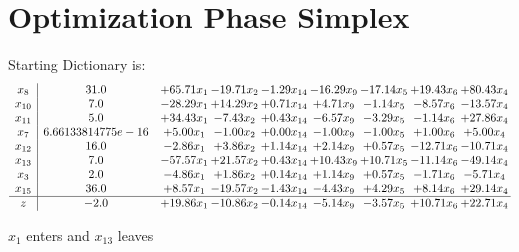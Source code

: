 \documentclass[9pt]{article}
\begin{document}
\section{Optimization Phase Simplex}
Starting Dictionary is:
\[\begin{array}{c| c c@{\hskip 2pt} c@{\hskip 2pt} c@{\hskip 2pt} c@{\hskip 2pt} c@{\hskip 2pt} c@{\hskip 2pt} c@{\hskip 2pt} }
 x_{8}   &  31.0 & + 65.71 x_{1} & -19.71 x_{2} & -1.29 x_{14} & -16.29 x_{9} & -17.14 x_{5} & + 19.43 x_{6} & + 80.43 x_{4}\\
 x_{10}   &  7.0 & -28.29 x_{1} & + 14.29 x_{2} & +  0.71 x_{14} & +  4.71 x_{9} & -1.14 x_{5} & -8.57 x_{6} & -13.57 x_{4}\\
 x_{11}   &  5.0 & + 34.43 x_{1} & -7.43 x_{2} & +  0.43 x_{14} & -6.57 x_{9} & -3.29 x_{5} & -1.14 x_{6} & + 27.86 x_{4}\\
 x_{7}   &  6.66133814775e-16 & +  5.00 x_{1} & -1.00 x_{2} & +  0.00 x_{14} & -1.00 x_{9} & -1.00 x_{5} & +  1.00 x_{6} & +  5.00 x_{4}\\
 x_{12}   &  16.0 & -2.86 x_{1} & +  3.86 x_{2} & +  1.14 x_{14} & +  2.14 x_{9} & +  0.57 x_{5} & -12.71 x_{6} & -10.71 x_{4}\\
 x_{13}   &  7.0 & -57.57 x_{1} & + 21.57 x_{2} & +  0.43 x_{14} & + 10.43 x_{9} & + 10.71 x_{5} & -11.14 x_{6} & -49.14 x_{4}\\
 x_{3}   &  2.0 & -4.86 x_{1} & +  1.86 x_{2} & +  0.14 x_{14} & +  1.14 x_{9} & +  0.57 x_{5} & -1.71 x_{6} & -5.71 x_{4}\\
 x_{15}   &  36.0 & +  8.57 x_{1} & -19.57 x_{2} & -1.43 x_{14} & -4.43 x_{9} & +  4.29 x_{5} & +  8.14 x_{6} & + 29.14 x_{4}\\
\hline
z    &  -2.0 & + 19.86 x_{1} & -10.86 x_{2} & -0.14 x_{14} & -5.14 x_{9} & -3.57 x_{5} & + 10.71 x_{6} & + 22.71 x_{4}\\
\end{array}\]


 $ x_{1} $ enters and $ x_{13} $ leaves 
\end{document}
